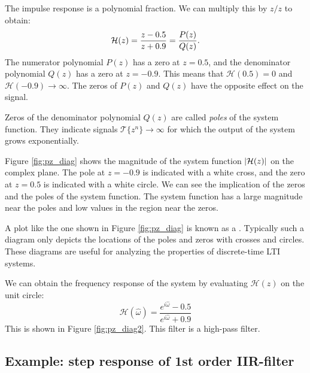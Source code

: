 The impulse response is a polynomial fraction. We can multiply this by
$z/z$ to obtain:
\begin{equation}
\mathcal{H}(z) = \frac{z-0.5}{z+0.9} = \frac{P(z)}{Q(z)}.
\label{eq:example_iir_system_hpf}
\end{equation}
The numerator polynomial $P(z)$ has a zero at $z=0.5$, and the
denominator polynomial $Q(z)$ has a zero at $z=-0.9$. This means that
$\mathcal{H}(0.5)=0$ and $\mathcal{H}(-0.9)\rightarrow \infty$. The
zeros of $P(z)$ and $Q(z)$ have the opposite effect on the signal.

Zeros of the denominator polynomial $Q(z)$ are called \emph{poles} of
the system function. They indicate signals
$\mathcal{T}\{z^{n}\} \rightarrow \infty$ for which the output of the
system grows exponentially.


Figure \ref{fig:pz_diag} shows the magnitude of the system function
$|\mathcal{H}(z)|$ on the complex plane. The pole at $z=-0.9$ is indicated with
a white cross, and the zero at $z=0.5$ is indicated with a white
circle. We can see the implication of the zeros and the poles of the
system function. The system function has a large magnitude near the
poles and low values in the region near the zeros.

A plot like the one shown in Figure \ref{fig:pz_diag} is known as a
\emph{}. Typically such a diagram only depicts the locations
of the poles and zeros with crosses and circles. These diagrams are
useful for analyzing the properties of discrete-time LTI systems.

We can obtain the frequency response of the system by evaluating
$\mathcal{H}(z)$ on the unit circle:
\begin{equation}
\mathcal{H}(\hat{\omega}) = \frac{e^{i\hat{\omega}}-0.5}{e^{i\hat{\omega}}+0.9}
\end{equation}
This is shown in Figure \ref{fig:pz_diag2}. This filter is a high-pass
filter.




\subsection{Example: step response of 1st order IIR-filter}

